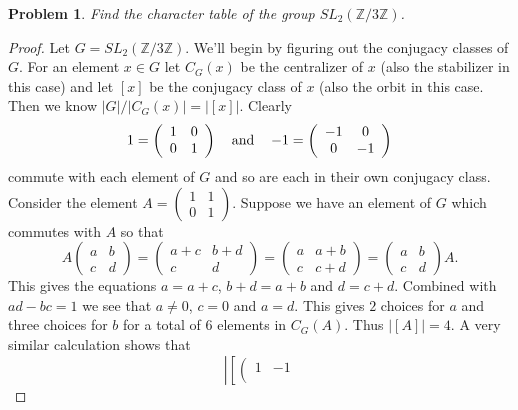 \documentclass{article}
\newtheorem{problem}{Problem}
\begin{document}
\begin{problem}
Find the character table of the group $SL_2(\mathbb{Z}/3\mathbb{Z})$.
\end{problem}
\begin{proof}
Let $G = SL_2(\mathbb{Z}/3\mathbb{Z})$. We'll begin by figuring out the conjugacy classes of $G$. For an element $x \in G$ let $C_G(x)$ be the centralizer of $x$ (also the stabilizer in this case) and let $[x]$ be the conjugacy class of $x$ (also the orbit in this case. Then we know $|G|/|C_G(x)| = |[x]|$. Clearly
\[
\begin{tabular}{ccc}
$
1 =
\left (
\begin{array}{cc}
1 & 0\\
0 & 1
\end{array}
\right )
$
&
and
&
$
-1 =
\left (
\begin{array}{cc}
-1 & 0\\
0 & -1
\end{array}
\right )
$
\end{tabular}
\]
commute with each element of $G$ and so are each in their own conjugacy class. Consider the element $A = \left ( \begin{array}{cc} 1 & 1\\ 0 & 1 \end{array} \right )$. Suppose we have an element of $G$ which commutes with $A$ so that
\[
A \left (
\begin{array}{cc}
a & b\\
c & d
\end{array}
\right )
=
\left (
\begin{array}{cc}
a + c & b + d\\
c & d
\end{array}
\right )
=
\left (
\begin{array}{cc}
a & a + b\\
c & c + d
\end{array}
\right )
=
\left (
\begin{array}{cc}
a & b\\
c & d
\end{array}
\right )
A.
\]
This gives the equations $a = a + c$, $b + d = a + b$ and $d = c + d$. Combined with $ad - bc = 1$ we see that $a \neq 0$, $c = 0$ and $a = d$. This gives $2$ choices for $a$ and three choices for $b$ for a total of $6$ elements in $C_G(A)$. Thus $|[A]| = 4$. A very similar calculation shows that
\[
\left | \left [ \left (
\begin{array}{cc}
1 & -1\\

\end{array}\]
\end{proof}
\end{document}
